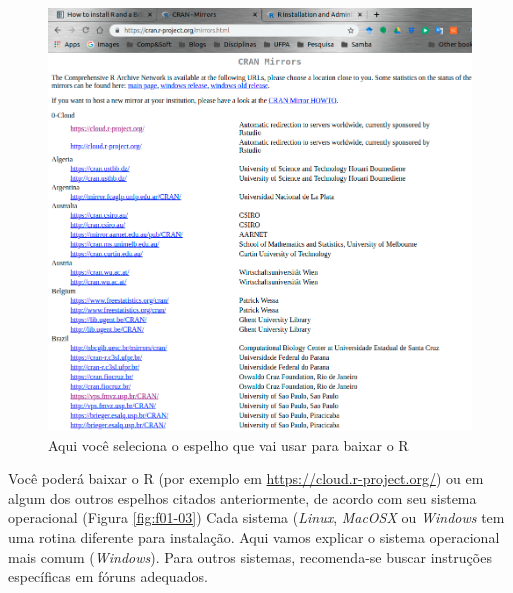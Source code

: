 \documentclass[12pt,a4paper,oneside]{erdc}
\begin{document}
\begin{figure}[htpb]
	\centering
	\includegraphics[width=\linewidth]{../figs/BP_Curso_TecComp_00_2019_f01-02}
	\caption{Aqui você seleciona o espelho que vai usar para baixar o R}
	\label{fig:f01-02}
\end{figure}

Você poderá baixar o R (por exemplo em \url{https://cloud.r-project.org/}) ou em algum dos outros espelhos citados anteriormente, de acordo com seu sistema operacional (Figura \ref{fig:f01-03}) Cada sistema (\textit{Linux}, \textit{MacOSX} ou \textit{Windows} tem uma rotina diferente para instalação. Aqui vamos explicar o sistema operacional mais comum (\textit{Windows}). Para outros sistemas, recomenda-se buscar instruções específicas em fóruns adequados.
\end{document}
